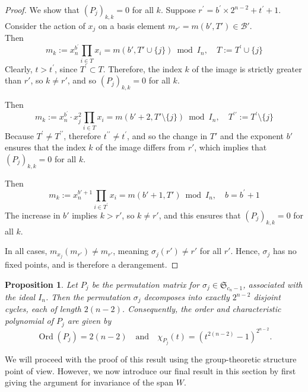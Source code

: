 \documentclass[11pt]{amsart}
\theoremstyle{plain}
\newtheorem{prop}[theorem]{Proposition}
\theoremstyle{definition}
\theoremstyle{remark}
\begin{document}
\begin{proof}
	We show that \( (P_j)_{k,k} = 0 \) for all \( k \). Suppose \( r^{\prime} = b^{\prime} \times 2^{n-2} + t^{\prime} +1 \). Consider the action of \( x_j \) on a basis element \( m_{r'} = m(b', T') \in \mathcal{B}' \).\\
	 Then
	\[ 
		m_k := x_n^{b^{\prime}} \prod_{i \in T} x_i = m(b', T' \cup \{j\}) \bmod{ I_n}, \quad T := T^{\prime} \cup \{j\} 
	\] Clearly, \( t> t^{\prime} \), since \( T^{\prime} \subset T \). Therefore, the index \( k \) of the image is strictly greater than \( r' \), so \( k \neq r' \), and so \( (P_j)_{k,k} = 0 \) for all \( k \).
	
	  Then
	\[
	 m_k := x_n^{b^{\prime}} \cdot x_j^2 \prod_{i \in T} x_i = m(b' + 2, T' \setminus \{j\}) \bmod{ I_n}, \quad T^{\prime\prime} := T^{\prime} \setminus \{j\} 
	 \] Because \( T^{\prime} \neq T^{\prime\prime} \), therefore \( t^{\prime\prime} \neq t^{\prime} \), and so the change in \( T' \) and the exponent \( b' \) ensures that the index \( k \) of the image differs from \( r' \), which implies that \( (P_j)_{k,k} = 0 \) for all \( k \).
	
	 Then
	\[
	  m_k := x_n^{b'+1} \prod_{i \in T^{\prime}} x_i = m(b' + 1, T') \bmod{ I_n}, \quad b = b^{\prime} + 1  
	 \] The increase in \( b' \) implies \( k > r' \), so \( k \neq r' \), and this ensures that \( (P_j)_{k,k} = 0 \) for all \( k \).
	
	In all cases, \( m_{x_j}(m_{r'}) \neq m_{r'} \), meaning \( \sigma_j(r') \neq r' \) for all \( r' \). Hence, \( \sigma_j \) has no fixed points, and is therefore a derangement.
\end{proof}


\begin{prop}
	\label{prop:cycle-structure} 
	 Let \( P_j \) be the permutation matrix for \( \sigma_j \in \mathfrak{S}_{c_n-1} \), associated with the ideal \( I_n \). Then the permutation \( \sigma_j \) decomposes into exactly \( 2^{n-2} \) disjoint cycles, each of length \( 2(n-2) \). Consequently, the order and characteristic polynomial of \( P_j \) are given by \[  \operatorname{Ord}(P_j) = 2 (n - 2) \quad \text{and} \quad \chi_{P_j}(t) = \left( t^{2 (n-2)} - 1 \right)^{2^{n-2}}. \] 	
\end{prop}

We will proceed with the proof of this result using the group-theoretic structure point of view. However, we now introduce our final result in this section by first giving the argument for invariance of the span \( W\).
\end{document}
